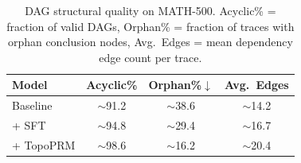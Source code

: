 \begin{table}[!htb]
\centering
\caption{DAG structural quality on MATH-500. Acyclic\% = fraction of valid DAGs,
Orphan\% = fraction of traces with orphan conclusion nodes,
Avg.~Edges = mean dependency edge count per trace.}
\label{tab:dag_structural_public}
\begin{tabular}{l ccc}
\toprule
\textbf{Model} & \textbf{Acyclic\%} & \textbf{Orphan\%$\downarrow$} & \textbf{Avg.~Edges} \\
\midrule
Baseline      & {$\sim$}91.2 & {$\sim$}38.6 & {$\sim$}14.2 \\
+ SFT & {$\sim$}94.8 & {$\sim$}29.4 & {$\sim$}16.7 \\
+ TopoPRM  & {$\sim$}98.6 & {$\sim$}16.2 & {$\sim$}20.4 \\
\bottomrule
\end{tabular}
\end{table}
